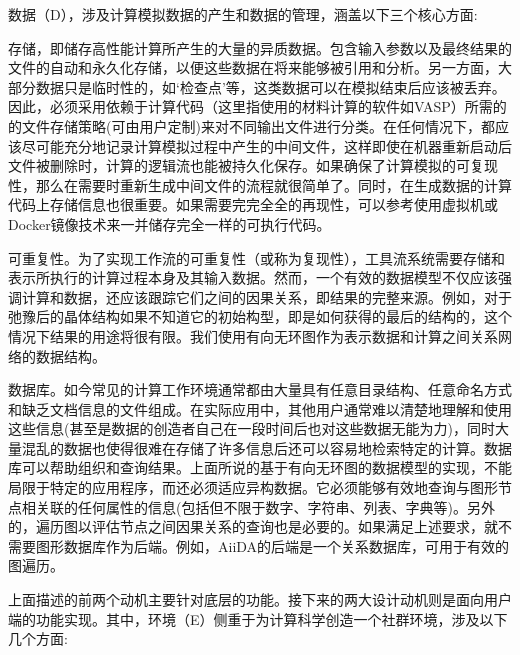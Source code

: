 数据（D），涉及计算模拟数据的产生和数据的管理，涵盖以下三个核心方面:
\begin{alphaenum}
    \item 存储，即储存高性能计算所产生的大量的异质数据。包含输入参数以及最终结果的文件的自动和永久化存储，以便这些数据在将来能够被引用和分析。另一方面，大部分数据只是临时性的，如‘检查点’等，这类数据可以在模拟结束后应该被丢弃。因此，必须采用依赖于计算代码（这里指使用的材料计算的软件如VASP）所需的的文件存储策略(可由用户定制)来对不同输出文件进行分类。在任何情况下，都应该尽可能充分地记录计算模拟过程中产生的中间文件，这样即使在机器重新启动后文件被删除时，计算的逻辑流也能被持久化保存。如果确保了计算模拟的可复现性，那么在需要时重新生成中间文件的流程就很简单了。同时，在生成数据的计算代码上存储信息也很重要。如果需要完完全全的再现性，可以参考使用虚拟机或Docker镜像技术来一并储存完全一样的可执行代码。
    \item 可重复性。为了实现工作流的可重复性（或称为复现性），工具流系统需要存储和表示所执行的计算过程本身及其输入数据。然而，一个有效的数据模型不仅应该强调计算和数据，还应该跟踪它们之间的因果关系，即结果的完整来源。例如，对于弛豫后的晶体结构如果不知道它的初始构型，即是如何获得的最后的结构的，这个情况下结果的用途将很有限。我们使用有向无环图作为表示数据和计算之间关系网络的数据结构。
    \item 数据库。如今常见的计算工作环境通常都由大量具有任意目录结构、任意命名方式和缺乏文档信息的文件组成。在实际应用中，其他用户通常难以清楚地理解和使用这些信息(甚至是数据的创造者自己在一段时间后也对这些数据无能为力)，同时大量混乱的数据也使得很难在存储了许多信息后还可以容易地检索特定的计算。数据库可以帮助组织和查询结果。上面所说的基于有向无环图的数据模型的实现，不能局限于特定的应用程序，而还必须适应异构数据。它必须能够有效地查询与图形节点相关联的任何属性的信息(包括但不限于数字、字符串、列表、字典等)。另外的，遍历图以评估节点之间因果关系的查询也是必要的。如果满足上述要求，就不需要图形数据库作为后端。例如，AiiDA的后端是一个关系数据库，可用于有效的图遍历。
\end{alphaenum}

上面描述的前两个动机主要针对底层的功能。接下来的两大设计动机则是面向用户端的功能实现。其中，环境（E）侧重于为计算科学创造一个社群环境，涉及以下几个方面:

